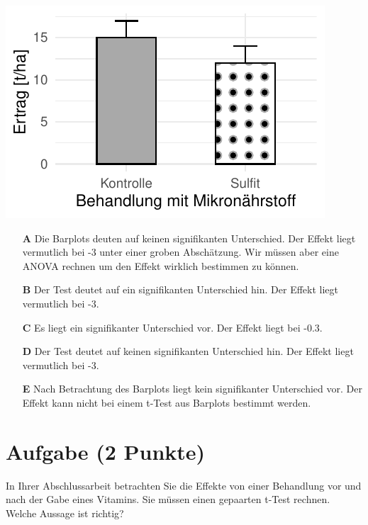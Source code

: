 \documentclass[a4paper, 9pt]{scrartcl}\usepackage[]{graphicx}\usepackage[]{xcolor}
\makeatletter
\def\maxwidth{ %
  \ifdim\Gin@nat@width>\linewidth
    \linewidth
  \else
    \Gin@nat@width
  \fi
}
\makeatother
\begin{document}
{\centering \includegraphics[width=\maxwidth]{img/mc-testing-ttest-02-1} 

}







\begin{enumerate}
\item [\textbf{A} \msquare] Die Barplots deuten auf keinen signifikanten Unterschied. Der Effekt liegt vermutlich bei -3 unter einer groben Abschätzung. Wir müssen aber eine ANOVA rechnen um den Effekt wirklich bestimmen zu können.
\item [\textbf{B} \msquare] Der Test deutet auf ein signifikanten Unterschied hin. Der Effekt liegt vermutlich bei -3.
\item [\textbf{C} \msquare] Es liegt ein signifikanter Unterschied vor. Der Effekt liegt bei -0.3.
\item [\textbf{D} \msquare] Der Test deutet auf keinen signifikanten Unterschied hin. Der Effekt liegt vermutlich bei -3.
\item [\textbf{E} \msquare] Nach Betrachtung des Barplots liegt kein signifikanter Unterschied vor. Der Effekt kann nicht bei einem t-Test aus Barplots bestimmt werden.
\end{enumerate}

\section{Aufgabe \hfill (2 Punkte)}




In Ihrer Abschlussarbeit betrachten Sie die Effekte von einer Behandlung vor und nach der Gabe eines Vitamins. Sie müssen einen gepaarten t-Test rechnen. Welche Aussage ist richtig?
\end{document}
